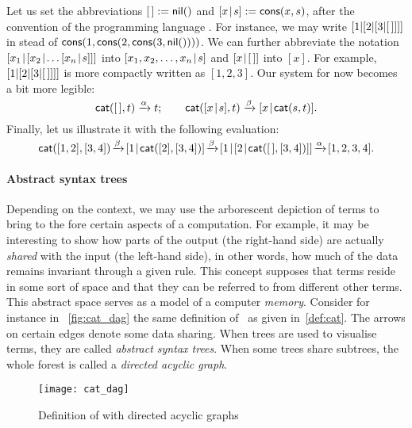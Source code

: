 Let us set the abbreviations \([\,] :=
\textsf{nil}()\) and \([{x}\!\mid\!{s}] :=
\textsf{cons}(x,s)\), after the convention of
the programming language
\Prolog \citep{SterlingShapiro_1994,Bratko_2000}. For instance, we may
write \([1|[2|[3|[\,]]]]\) in stead of
\(\textsf{cons}(1,\textsf{cons}(2,\textsf{cons}(3,\textsf{nil}())))\).  We can
further abbreviate the notation \([{x_1}\!\mid\!{[{x_2}\!\mid\!{\dots
    [{x_n}\!\mid\!{s}]}]}]\) into \([{x_1,x_2,\dots,x_n}\!\mid\!{s}]\) and
\([{x}\!\mid\!{[\,]}]\) into \([x]\). For example, \([1|[2|[3|[\,]]]]\) is
more compactly written as \([1,2,3]\). Our system for
 now becomes a bit more legible:
\begin{equation}
\fun{cat}(        \el,t) \xrightarrow{\smash{\alpha}} t;\qquad
\fun{cat}(\cons{x}{s},t) \xrightarrow{\smash{\beta}}
\cons{x}{\fun{cat}(s,t)}.
\label{def:cat}\index{stack!catenation!definition}
\end{equation}
Finally, let us illustrate it with the following
evaluation:
\begin{equation*}
\fun{cat}([1,2],[3,4])
\!\xrightarrow{\smash{\beta}}\!
\cons{1}{\fun{cat}([2],[3,4])}
\!\xrightarrow{\smash{\beta}}\!
\cons{1}{\cons{2}{\fun{cat}(\el,[3,4])}}
\!\xrightarrow{\smash{\alpha}}\!
[1,2,3,4].
\end{equation*}

\paragraph{Abstract syntax trees}

Depending on the context, we may use the arborescent depiction of
terms to bring to the fore certain aspects of a computation. For
example, it may be interesting to show how parts of the output (the
right\hyp{}hand side) are actually \emph{shared} with
the input (the left\hyp{}hand side), in other words, how much of the
data remains invariant through a given rule. This concept supposes
that terms reside in some sort of space and that they can be referred
to from different other terms. This abstract space serves as a model
of a computer \emph{memory}. Consider for instance in
\fig~\vref{fig:cat_dag} the same definition of~ as given
in~\eqref{def:cat}. The arrows on certain edges denote some data
sharing. When trees are used to visualise terms, they are called
\emph{abstract syntax trees}. When
some trees share subtrees, the whole forest is called a \emph{directed
  acyclic graph}.
\begin{figure}[h]
\centering
\texttt{[image: cat\_dag]}
\caption{Definition of  with directed acyclic graphs
\label{fig:cat_dag}}
\end{figure}

